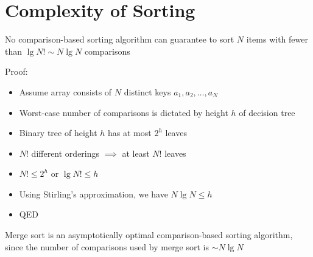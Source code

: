 \documentclass[8pt,a4paper,compress]{beamer}
\begin{document}
\section{Complexity of Sorting}
\begin{frame}[fragile]
\pause

No comparison-based sorting algorithm can guarantee to sort $N$ items with fewer than $\lg N! \sim N\lg N$ comparisons

\pause
\bigskip

\begin{minipage}{150pt}
Proof: \begin{itemize}
\item Assume array consists of $N$ distinct keys $a_1, a_2, \dots, a_N$
\item Worst-case number of comparisons is dictated by height $h$ of decision tree
\item Binary tree of height $h$ has at most $2^h$ leaves
\item $N!$ different orderings $\implies$ at least $N!$ leaves
\item $N! \leq 2^h$ or $\lg N! \leq h$ 
\item Using Stirling's approximation, we have $N\lg N \leq h$
\item QED
\end{itemize}
\end{minipage}
\begin{minipage}{150pt}
\end{minipage}

\pause
\bigskip

Merge sort is an asymptotically optimal comparison-based sorting algorithm, since the number of comparisons used by merge sort is $\sim N\lg N$
\end{frame}
\end{document}
